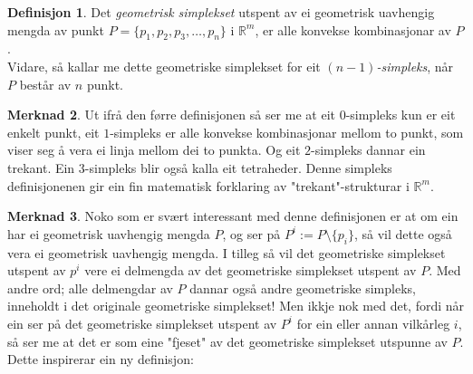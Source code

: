 \documentclass[a4paper, titlepage, 12pt, norsk]{article}
\theoremstyle{plain}
\newtheorem{theorem}{Teorem}[section]
\theoremstyle{definition}
\newtheorem{definition}[theorem]{Definisjon}
\newtheorem{remark}[theorem]{Merknad}
\newcommand{\R}{\mathbb{R}}
\begin{document}
\begin{definition}
	Det \emph{geometrisk simplekset} utspent av ei geometrisk uavhengig mengda av punkt $P=\{p_1, p_2, p_3, \dots, p_n\}$ i $\R^m$, er alle konvekse kombinasjonar av $P$.
	\\Vidare, så kallar me dette geometriske simplekset for eit \emph{$(n-1)$-simpleks}, når $P$ består av $n$ punkt.
\end{definition}
\begin{remark}
	Ut ifrå den førre definisjonen så ser me at eit $0$-simpleks kun er eit enkelt punkt, eit $1$-simpleks er alle konvekse kombinasjonar mellom to punkt, som viser seg å vera ei linja mellom dei to punkta. Og eit $2$-simpleks dannar ein trekant. Ein $3$-simpleks blir også kalla eit tetraheder. Denne simpleks definisjonenen gir ein fin matematisk forklaring av "trekant"-strukturar i $\R^m$.
\end{remark}
\begin{remark}
	Noko som er svært interessant med denne definisjonen er at om ein har ei geometrisk uavhengig mengda $P$, og ser på $P^i := P \setminus \{p_i\}$, så vil dette også vera ei geometrisk uavhengig mengda. I tilleg så vil det geometriske simplekset utspent av $p^i$ vere ei delmengda av det geometriske simplekset utspent av $P$. Med andre ord; alle delmengdar av $P$ dannar også andre geometriske simpleks, inneholdt i det originale geometriske simplekset! Men ikkje nok med det, fordi når ein ser på det geometriske simplekset utspent av $P^i$ for ein eller annan vilkårleg $i$, så ser me at det er som eine "fjeset" av det geometriske simplekset utspunne av $P$. Dette inspirerar ein ny definisjon:
\end{remark}
\end{document}
